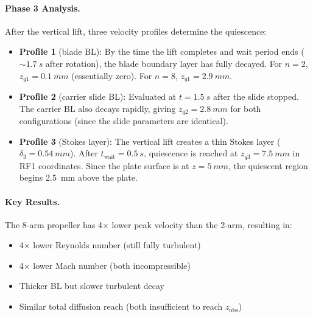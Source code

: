 \documentclass[11pt,a4paper]{article}
\begin{document}
\paragraph{Phase 3 Analysis.}
After the vertical lift, three velocity profiles determine the quiescence:
\begin{itemize}[nosep]
  \item \textbf{Profile 1} (blade BL): By the time the lift completes and
    wait period ends ($\sim\SI{1.7}{s}$ after rotation), the blade boundary
    layer has fully decayed. For $n = 2$, $z_{q1} = \SI{0.1}{mm}$ (essentially
    zero). For $n = 8$, $z_{q1} = \SI{2.9}{mm}$.
  \item \textbf{Profile 2} (carrier slide BL): Evaluated at $t = \SI{1.5}{s}$
    after the slide stopped. The carrier BL also decays rapidly, giving
    $z_{q2} = \SI{2.8}{mm}$ for both configurations (since the slide
    parameters are identical).
  \item \textbf{Profile 3} (Stokes layer): The vertical lift creates a thin
    Stokes layer ($\delta_3 = \SI{0.54}{mm}$). After $t_\mathrm{wait} = \SI{0.5}{s}$,
    quiescence is reached at $z_{q3} = \SI{7.5}{mm}$ in RF1 coordinates.
    Since the plate surface is at $z = \SI{5}{mm}$, the quiescent region
    begins \SI{2.5}{mm} above the plate.
\end{itemize}

\paragraph{Key Results.}
The 8-arm propeller has 4$\times$ lower peak velocity than the 2-arm,
resulting in:
\begin{itemize}[nosep]
  \item 4$\times$ lower Reynolds number (still fully turbulent)
  \item 4$\times$ lower Mach number (both incompressible)
  \item Thicker BL but slower turbulent decay
  \item Similar total diffusion reach (both insufficient to reach $z_\mathrm{obs}$)
\end{itemize}
\end{document}
